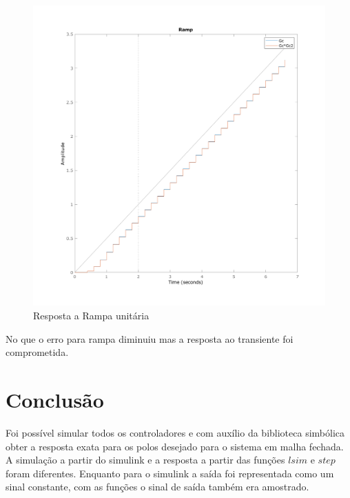\documentclass[a4paper,11pt]{article}
\begin{document}
\begin{figure}[H]
    \centering
    \includegraphics[width=0.8\linewidth]{img/exsim3-ramp-g3-control.png}
    \caption{Resposta a Rampa unitária}
    \label{fig:ex3-step-g2-control}
\end{figure}

No que o erro para rampa diminuiu mas a resposta ao transiente foi comprometida.

\section{Conclusão}

Foi possível simular todos os controladores e com auxílio da biblioteca simbólica obter a resposta exata para os polos desejado para o sistema em malha fechada. A simulação a partir do simulink e a resposta a partir das funções $lsim$ e $step$ foram diferentes. Enquanto para o simulink a saída foi representada como um sinal constante, com as funções o sinal de saída também era amostrado.

\newpage

\nocite{sympy}
\nocite{pythontex}
\nocite{matlabcontrol}
\nocite{matlabsymbolic}
\end{document}
